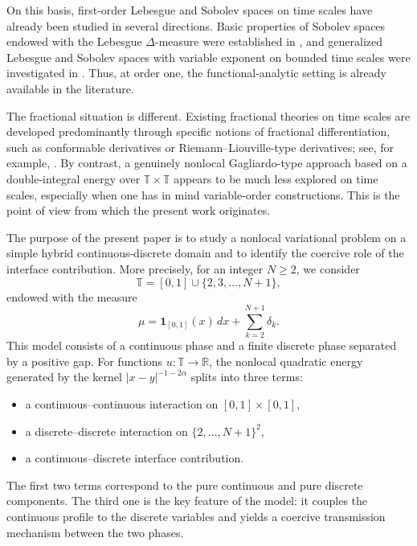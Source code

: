 \documentclass[11pt]{article}
\numberwithin{equation}{section}
\theoremstyle{definition}
\newcommand{\R}{\mathbb{R}}
\newcommand{\T}{\mathbb{T}}
\newcommand{\abs}[1]{\lvert#1\rvert}
\begin{document}
On this basis, first-order Lebesgue and Sobolev spaces on time scales have already been studied in several directions. Basic properties of Sobolev spaces endowed with the Lebesgue $\Delta$-measure were established in \cite{AgarwalOteroPereraVivero2006}, and generalized Lebesgue and Sobolev spaces with variable exponent on bounded time scales were investigated in \cite{SkrzypekSzymanska2019}. Thus, at order one, the functional-analytic setting is already available in the literature.

The fractional situation is different. Existing fractional theories on time scales are developed predominantly through specific notions of fractional differentiation, such as conformable derivatives or Riemann--Liouville-type derivatives; see, for example, \cite{BenkhettouHassaniTorres2016, HuLi2022Right, HuLi2022Left}. By contrast, a genuinely nonlocal Gagliardo-type approach based on a double-integral energy over $\T\times\T$ appears to be much less explored on time scales, especially when one has in mind variable-order constructions. This is the point of view from which the present work originates.

The purpose of the present paper is to study a nonlocal variational problem on a simple hybrid continuous-discrete domain and to identify the coercive role of the interface contribution. More precisely, for an integer $N\ge 2$, we consider
\[
\T=[0,1]\cup\{2,3,\dots,N+1\},
\]
endowed with the measure
\[
\mu=\mathbf{1}_{[0,1]}(x)\,dx+\sum_{k=2}^{N+1}\delta_k.
\]
This model consists of a continuous phase and a finite discrete phase separated by a positive gap. For functions $u:\T\to\R$, the nonlocal quadratic energy generated by the kernel $\abs{x-y}^{-1-2\alpha}$ splits into three terms:
\begin{itemize}
\item a continuous--continuous interaction on $[0,1]\times[0,1]$,
\item a discrete--discrete interaction on $\{2,\dots,N+1\}^2$,
\item a continuous--discrete interface contribution.
\end{itemize}
The first two terms correspond to the pure continuous and pure discrete components. The third one is the key feature of the model: it couples the continuous profile to the discrete variables and yields a coercive transmission mechanism between the two phases.
\end{document}
